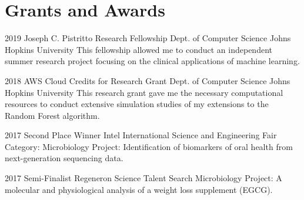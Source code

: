 \section{Grants and Awards}

\cventry
{2019}
{Joseph C. Pistritto Research Fellowship}
{Dept. of Computer Science}
{Johns Hopkins University}
{}
{This fellowship allowed me to conduct an independent summer research project focusing on the clinical applications of machine learning.}

\cventry
{2018}
{AWS Cloud Credits for Research Grant}
{Dept. of Computer Science}
{Johns Hopkins University}
{}
{This research grant gave me the necessary computational resources to conduct extensive simulation studies of my extensions to the Random Forest algorithm.}

\cventry
{2017}
{Second Place Winner}
{Intel International Science and Engineering Fair}
{Category: Microbiology}
{}
{Project: Identification of biomarkers of oral health from next-generation sequencing data.}

\cventry
{2017}
{Semi-Finalist}
{Regeneron Science Talent Search}
{Microbiology}
{}
{Project: A molecular and physiological analysis of a weight loss supplement (EGCG).}